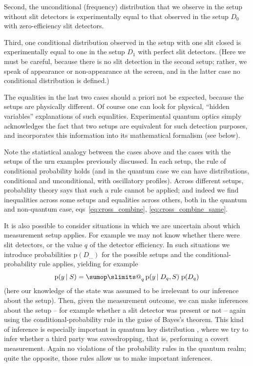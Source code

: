 \documentclass[\ifafour a4paper,12pt,\else a5paper,10pt,\fi%
onecolumn,oneside,article,%
british%
]{memoir}
\makeatletter
\theoremstyle{remark}
\theoremstyle{innote}
\def\sum{\DOTSI\sumop\slimits@}
\newcommand*{\citep}{\parencites}%
\newcommand*{\pf}{\mathrm{p}}%
\renewcommand*{\|}[1][]{\nonscript\,#1\vert\nonscript\;\mathopen{}}
\newcommand*{\eqns}{eqs}%
\newcommand*{\tsum}{\mathop{\textstyle\sum}\nolimits}
\newcommand*{\yDq}{D_{q}}
\makeatother
\begin{document}
Second, the unconditional (frequency) distribution that we observe in the
setup without slit detectors is experimentally equal to that observed in
the setup $D_{0}$ with zero-efficiency slit detectors.

Third, one conditional distribution observed in the setup with one slit
closed is experimentally equal to one in the setup $D_{1}$ with perfect
slit detectors. (Here we must be careful, because there is no slit
detection in the second setup; rather, we speak of appearance or
non-appearance at the screen, and in the latter case no conditional
distribution is defined.)

The equalities in the last two cases should a priori not be expected,
because the setups are physically different. Of course one can look for
physical, \enquote{hidden variables} explanations of such equalities.
Experimental quantum optics simply acknowledges the fact that two setups
are equivalent for such detection purposes, and incorporates this
information into its mathematical formalism (see below).

\medskip

Note the statistical analogy between the cases above and the cases with the
setups of the urn examples previously discussed. In each setup, the rule of
conditional probability holds (and in the quantum case we can have
distributions, conditional and unconditional, with oscillatory profiles).
Across different setups, probability theory says that such a rule cannot be
applied; and indeed we find inequalities across some setups and equalities
across others, both in the quantum and non-quantum case,
\eqns~\eqref{eq:cross_combine}, \eqref{eq:cross_combine_same}.

\medskip

It is also possible to consider situations in which we are uncertain about
which measurement setup applies. For example we may not know whether there
were slit detectors, or the value $q$ of the detector efficiency. In such
situations we introduce probabilities $\pf(D_{\dotso})$ for the possible
setups and the conditional-probability rule applies, yielding for example
\begin{equation}
  \label{eq:conditional_setups}
  \pf(y \| S) = \tsum_{q} \pf(y \| \yDq, S)\;\pf(\yDq)
\end{equation}
(here our knowledge of the state was assumed to be irrelevant to our
inference about the setup). Then, given the measurement outcome, we can
make inferences about the setup
\citep{barnettetal2003,zimanetal2004_r2006,darianoetal2004}[see
also][]{rigoetal1998} -- for example whether a slit detector was present or
not -- again using the conditional-probability rule in the guise of Bayes's
theorem. This kind of inference is especially important in quantum key
distribution \citep{nielsenetal2000_r2010}, where we try to infer whether a
third party was eavesdropping, that is, performing a covert measurement.
Again no violations of the probability rules in the quantum realm; quite
the opposite, those rules allow us to make important inferences.
\end{document}
